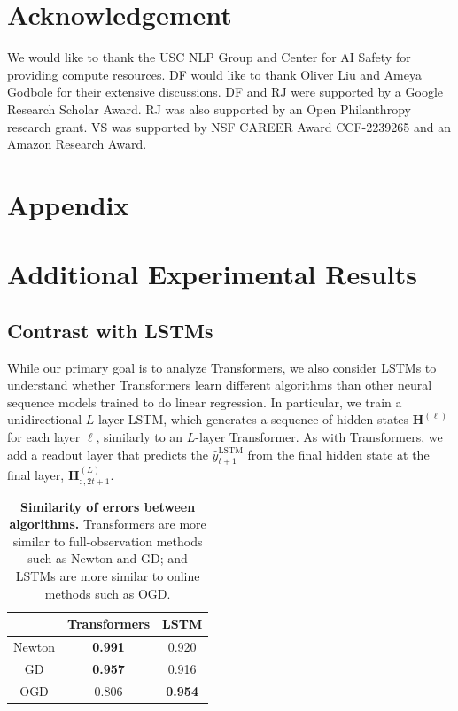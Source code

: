 \documentclass[11pt]{article}
\theoremstyle{plain}
\theoremstyle{definition}
\theoremstyle{remark}
\renewcommand{\^}[1]{^{(#1)}}
\newcommand{\bH}{\boldsymbol{H}}
\begin{document}
\section*{Acknowledgement}
We would like to thank the USC NLP Group and Center for AI Safety for providing compute resources. DF would like to thank Oliver Liu and Ameya Godbole for their extensive discussions. 
DF and RJ were supported by a Google Research Scholar Award.
RJ was also supported by an Open Philanthropy research grant.
VS was supported by NSF CAREER Award CCF-2239265 and an Amazon Research Award.




\clearpage
\onecolumn
\section*{Appendix}
\appendix
\startcontents[appendix]
\renewcommand{\thesection}{\Alph{section}} 


\setcounter{section}{0}

\section{Additional Experimental Results} \label{app:add_exp}

\subsection{Contrast with LSTMs} \label{app:lstm}

While our primary goal is to analyze Transformers, we also consider LSTMs \citep{hochreiter1997lstm} to understand whether Transformers learn different algorithms than other neural sequence models trained to do linear regression. In particular, we train a unidirectional $L$-layer LSTM, which generates a sequence of hidden states $\bH^{(\ell)}$ for each layer $\ell$, similarly to an $L$-layer Transformer.
As with Transformers, we add a readout layer that predicts the $\hat{y}_{t+1}^{\mathrm{LSTM}}$ from the final hidden state at the final layer, $\bH_{:,2t+1}^{(L)}$.

\begin{table}[!htp]
    \centering
    \begin{tabular}{c|c|c}
        & Transformers &  LSTM \\
         \midrule
     Newton & \textbf{0.991} & 0.920  \\
     GD & \textbf{0.957} & 0.916 \\
     OGD   & 0.806 & \textbf{0.954}  
    \end{tabular}
    \caption{\textbf{Similarity of errors between algorithms.} Transformers are more similar to full-observation methods such as Newton and GD; and LSTMs are more similar to online methods such as OGD.}
    \vspace{-1ex}
    \label{tab:lstm}
\end{table}
\end{document}
